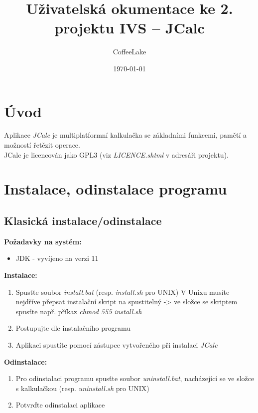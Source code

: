 \documentclass[a4paper, 11pt]{article}
\title{Uživatelská okumentace ke 2. projektu IVS -- JCalc}
\author{CoffeeLake}
\date{\today}
\begin{document}
\maketitle
\tableofcontents


\newpage

\section{Úvod}

Aplikace \emph{JCalc} je multiplatformní kalkulačka se základními funkcemi, pamětí a možností řetězit operace.\\
JCalc je licencován jako GPL3 (viz \emph{LICENCE.shtml} v adresáři projektu).


\section{Instalace, odinstalace programu}

\subsection{Klasická instalace/odinstalace}

\textbf{Požadavky na systém:}

\begin{itemize}
    \item JDK - vyvíjeno na verzi 11
\end{itemize}

\noindent
\textbf{Instalace:}

\begin{enumerate}
    \item Spusťte soubor \emph{install.bat} (resp. \emph{install.sh} pro UNIX)
    \subitem V Unixu musíte nejdříve přepsat instalační skript na spustitelný -> ve složce se skriptem spusťte např. příkaz \emph{chmod 555 install.sh}
    \item Postupujte dle instalačního programu
    \item Aplikaci spustíte pomocí zástupce vytvořeného při instalaci \emph{JCalc}
\end{enumerate}

\noindent
\textbf{Odinstalace:}

\begin{enumerate}
    \item Pro odinstalaci programu spusťte soubor \emph{uninstall.bat}, nacházející se ve složce s kalkulačkou (resp. \emph{uninstall.sh} pro UNIX)
    \item Potvrďte odinstalaci aplikace
\end{enumerate}
\end{document}
